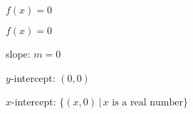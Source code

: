 {$f(x) = 0$}
{$f(x) = 0$

slope: $m =0$ 

$y$-intercept:  $(0,0)$

$x$-intercept:  $\{ (x,0) \, | \, \text{$x$ is a real number} \}$
\begin{center}
\end{center}}